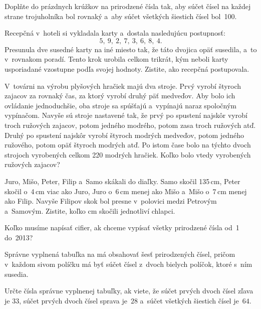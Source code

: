 {%
Doplňte do prázdnych krúžkov na \obr{} prirodzené čísla tak, aby súčet čísel na
každej strane trojuholníka bol rovnaký a~aby súčet všetkých šiestich čísel bol~100.
%
}

{%
Recepčná v~hoteli si vykladala karty a~dostala nasledujúcu postupnosť:
$$
5,\ 9,\ 2,\ 7,\ 3,\ 6,\ 8,\ 4.
$$
Presunula dve susedné karty na iné miesto tak, že
táto dvojica opäť susedila, a~to v~rovnakom poradí.
Tento krok urobila celkom trikrát,
kým neboli karty usporiadané vzostupne podľa svojej hodnoty.
Zistite, ako recepčná postupovala.}

{%
V~továrni na výrobu plyšových hračiek majú dva stroje.
Prvý vyrobí štyroch zajacov za rovnaký čas, za ktorý vyrobí druhý päť
medveďov.
Aby bolo ich ovládanie jednoduchšie, oba stroje sa spúšťajú a~vypínajú
naraz spoločným vypínačom.
Navyše sú stroje nastavené tak, že prvý po spustení najskôr vyrobí troch
ružových zajacov, potom jedného modrého, potom zasa troch ružových atď.
Druhý po spustení najskôr vyrobí štyroch modrých medveďov, potom jedného ružového,
potom opäť štyroch modrých atď.
Po istom čase bolo na týchto dvoch strojoch vyrobených celkom 220 modrých
hračiek.
Koľko bolo vtedy vyrobených ružových zajacov?
}

{%
Juro, Mišo, Peter, Filip a~Samo skákali do diaľky.
Samo skočil 135\,cm,
Peter skočil o~4\,cm viac ako Juro,
Juro o~6\,cm menej ako Mišo
a~Mišo o~7\,cm menej ako Filip.
Navyše Filipov skok bol presne v~polovici medzi Petrovým a~Samovým.
Zistite, koľko cm skočili jednotliví chlapci.}

{%
Koľko musíme napísať cifier, ak chceme vypísať všetky prirodzené čísla od~1
do~2013?}

{%
Správne vyplnená tabuľka na \obr{} má obsahovať šesť prirodzených čísel,
pričom v~každom sivom políčku má byť súčet čísel z~dvoch bielych políčok, ktoré s~ním
susedia.
%

Určte čísla správne vyplnenej tabuľky, ak viete, že súčet prvých dvoch čísel
zľava je $33$, súčet prvých dvoch čísel sprava je~$28$ a~súčet všetkých šiestich
čísel je~$64$.}

